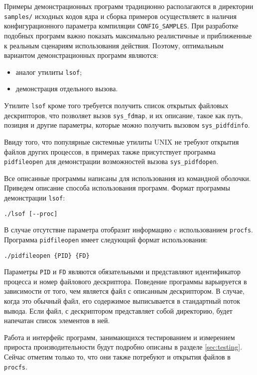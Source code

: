 Примеры демонстрационных программ традиционно располагаются в директории
\texttt{samples/} исходных кодов ядра и сборка примеров осуществляетс в наличия
конфигурационного параметра компиляции \texttt{CONFIG\_SAMPLES}. При разработке
подобных программ важно
показать максимально реалистичные и приближенные к реальным сценариям
использования действия. Поэтому, оптимальным вариантом демонстрационных программ
являются:
\begin{itemize}
\item аналог утилиты \texttt{lsof};
\item демонстрация отдельного вызова.
\end{itemize}

Утилите \texttt{lsof} кроме того требуется получить список открытых файловых
дескрипторов, что позволяет вызов \texttt{sys\_fdmap}, и их описание, такое как
путь, позиция и другие параметры, которые можно получить вызовом
\texttt{sys\_pidfdinfo}.

Ввиду того, что популярные системные утилиты UNIX не требуют открытия файлов
других процессов, в примерах также присутствует программа \texttt{pidfileopen}
для демонстрации возможностей вызова \texttt{sys\_pidfdopen}.

Все описанные программы написаны для использования из командной оболочки.
Приведем описание способа использования программ. Формат программы демонстрации
\texttt{lsof}:

\medskip
\begin{lstlisting}[style=cstyle]
./lsof [--proc]
\end{lstlisting}
\medskip

В случае отсутствие параметра отобразит информацию c использованием
\texttt{procfs}. Программа \texttt{pidfileopen} имеет следующий формат
использования:

\medskip
\begin{lstlisting}[style=cstyle]
./pidfileopen {PID} {FD}
\end{lstlisting}
\medskip

Параметры \texttt{PID} и \texttt{FD} являются обязательными и представляют
идентификатор процесса и номер файлового дескриптора. Поведение программы
варьируется в зависимости от того, чем является файл с описанным дескриптором. В
случае, когда это обычный файл, его содержимое выписывается в стандартный поток
вывода. Если файл, с дескриптором представляет собой директорию, будет напечатан
список элементов в ней.

Работа и интерфейс программ, занимающихся тестированием и измерением прироста
производительности будут подробно описаны в разделе \ref{sec:testing}. Сейчас
отметим только то, что они также потребуют и открытия файлов в \texttt{procfs}.

